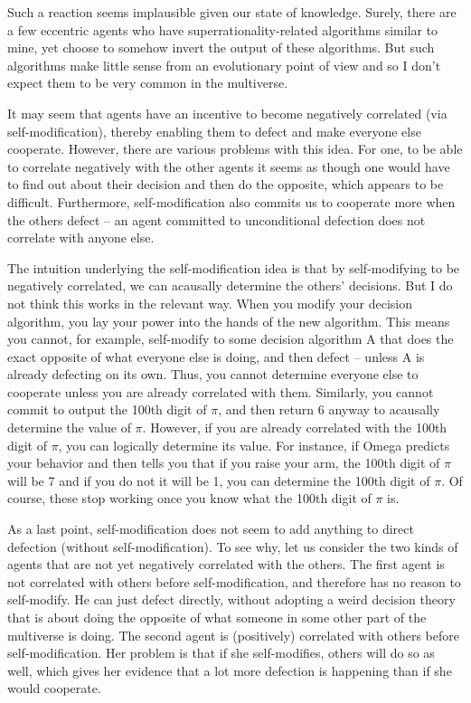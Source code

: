 Such a reaction seems implausible given our state of knowledge. Surely,
there are a few eccentric agents who have superrationality-related
algorithms similar to mine, yet choose to somehow invert the output of
these algorithms. But such algorithms make little sense from an
evolutionary point of view and so I don't expect them to be very common
in the multiverse.

It may seem that agents have an incentive to become negatively
correlated (via self-modification), thereby enabling them to defect and
make everyone else cooperate. However, there are various problems with
this idea. For one, to be able to correlate negatively with the other
agents it seems as though one would have to find out about their
decision and then do the opposite, which appears to be difficult.
Furthermore, self-modification also commits us to cooperate more when
the others defect -- an agent committed to unconditional defection does
not correlate with anyone else.

The intuition underlying the self-modification idea is that by
self-modifying to be negatively correlated, we can acausally determine
the others' decisions. But I do not think this works in the relevant
way. When you modify your decision algorithm, you lay your power into
the hands of the new algorithm. This means you cannot, for example,
self-modify to some decision algorithm A that does the exact opposite of
what everyone else is doing, and then defect -- unless A is already
defecting on its own. Thus, you cannot determine everyone else to
cooperate unless you are already correlated with them. Similarly, you
cannot commit to output the 100th digit of $\pi$, and then return 6 anyway
to acausally determine the value of $\pi$. However, if you are already
correlated with the 100th digit of $\pi$, you can logically determine its
value. For instance, if Omega predicts your behavior and then tells you
that if you raise your arm, the 100th digit of $\pi$ will be 7 and if you do
not it will be 1, you can determine the 100th digit of $\pi$. Of course,
these stop working once you know what the 100th digit of $\pi$ is.

As a last point, self-modification does not seem to add anything to
direct defection (without self-modification). To see why, let us
consider the two kinds of agents that are not yet negatively correlated
with the others. The first agent is not correlated with others before
self-modification, and therefore has no reason to self-modify. He can
just defect directly, without adopting a weird decision theory that is
about doing the opposite of what someone in some other part of the
multiverse is doing. The second agent is (positively) correlated with
others before self-modification. Her problem is that if she
self-modifies, others will do so as well, which gives her evidence that
a lot more defection is happening than if she would cooperate.

